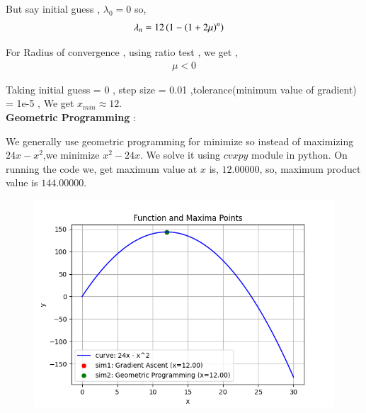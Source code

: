 \documentclass[journal]{IEEEtran}
\begin{document}
But say initial guess , $\lambda_0 = 0 $ so,
\begin{align}
\lambda_n &=  12\left(1 - \left(1+2\mu\right)^n\right)
\end{align}

For Radius of convergence , using ratio test , we get ,
\begin{align}
\mu < 0 
\end{align}

Taking initial guess = 0 , step size = 0.01 ,tolerance(minimum value of gradient) = 1e-5 , We get 
$x_{min} \approx 12 $. \\

\textbf{Geometric Programming} :

We generally use geometric programming for minimize so instead of maximizing $24x - x^2$,we minimize $x^2 -24x$.
We solve it using $cvxpy$ module in python. On running the code we, get maximum value at $x$ is, $12.00000$, so, maximum product value is $144.00000$.

\begin{figure}[h!]
   \centering
   \includegraphics[width=0.7\linewidth]{figs/Figure_1.png}
\end{figure}
\end{document}
